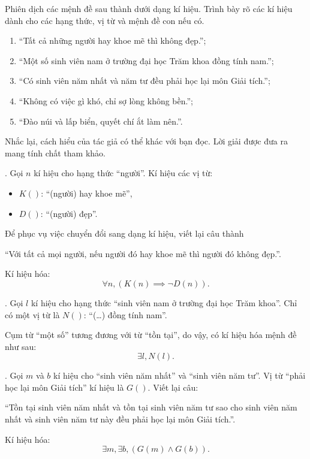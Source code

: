 \exercise
Phiên dịch các mệnh đề sau thành dưới dạng kí hiệu. Trình bày rõ các kí hiệu dành cho các hạng thức, vị từ và mệnh đề con nếu có.
\begin{enumerate}
    \item ``Tất cả những người hay khoe mẽ thì không đẹp.'';
    \item ``Một số sinh viên nam ở trường đại học Trăm khoa đồng tính nam.'';
    \item ``Có sinh viên năm nhất và năm tư đều phải học lại môn Giải tích.'';
    \item ``Không có việc gì khó, chỉ sợ lòng không bền.'';
    \item ``Đào núi và lấp biển, quyết chí ắt làm nên.''.
\end{enumerate}

\solution

Nhắc lại, cách hiểu của tác giả có thể khác với bạn đọc. Lời giải được đưa ra mang tính chất tham khảo.

\setcounter{subexercise}{1}
. Gọi $n$ kí hiệu cho hạng thức ``người''. Kí hiệu các vị từ:
\begin{itemize}
    \item $K()$: ``(người) hay khoe mẽ'',
    \item $D()$: ``(người) đẹp''.
\end{itemize}
Để phục vụ việc chuyển đổi sang dạng kí hiệu, viết lại câu thành
\begin{center}
    ``Với tất cả mọi người, nếu người đó hay khoe mẽ thì người đó không đẹp.''.
\end{center}
Kí hiệu hóa:
\begin{equation}
   \forall n, (K(n) \implies \neg D(n)). \label{eq:nen_tang_lo_gich:giai_tich_vi_tu_bac_nhat:thanh_to_cau_tao:ex-1}
\end{equation}

. Gọi $l$ kí hiệu cho hạng thức ``sinh viên nam ở trường đại học Trăm khoa''. Chỉ có một vị từ là $N()$: ``(\dots) đồng tính nam''.

Cụm từ ``một số'' tương đương với từ ``tồn tại'', do vậy, có kí hiệu hóa mệnh đề như sau:
\begin{equation*}
    \exists l, N(l).
\end{equation*}

. Gọi $m$ và $b$ kí hiệu cho ``sinh viên năm nhất'' và ``sinh viên năm tư''. Vị từ ``phải học lại môn Giải tích'' kí hiệu là $G()$. Viết lại câu:
\begin{center}
    ``Tồn tại sinh viên năm nhất và tồn tại sinh viên năm tư sao cho sinh viên năm nhất và sinh viên năm tư này đều phải học lại môn Giải tích.''.
\end{center}
Kí hiệu hóa:
\begin{equation*}
    \exists m, \exists b, (G(m) \land G(b)).
\end{equation*}

